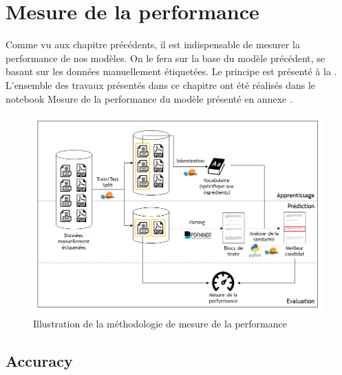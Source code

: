         {\renewcommand{\arraystretch}{1.5}%
        \begin{spacing}{1.0}
        \begin{center}
            {\scriptsize
            
            }
        \end{center}
        \end{spacing}
        }

    \chapter{Mesure de la performance}
    \label{performance}
    
    Comme vu aux chapitre précédents, il est indispensable de mesurer la performance de nos modèles.
    On le fera sur la base du modèle précédent, se basant sur les données manuellement étiquetées.
    Le principe est présenté à la .
    L'ensemble des travaux présentés dans ce chapitre ont été réalisés dans le notebook \og Mesure de la performance du modèle \fg présenté en annexe .

    \begin{figure}[htbp]
        \begin{center}
        \includegraphics[width=0.9\linewidth]{img/measured_model.png}
        \end{center}
        \caption{Illustration de la méthodologie de mesure de la performance}
        \label{fig:measured_model}
    \end{figure}     

        \section{Accuracy}
        
